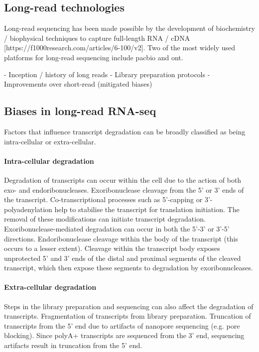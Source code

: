 \subsection{Long-read technologies}

Long-read sequencing has been made possible by the development of biochemistry / biophysical techniques to capture full-length RNA / cDNA [https://f1000research.com/articles/6-100/v2]. Two of the most widely used platforms for long-read sequencing include \gls{pacbio} and \gls{ont}.    

- Inception / history of long reads
- Library preparation protocols
- Improvements over short-read (mitigated biases)

\subsection{Biases in long-read RNA-seq}


Factors that influence transcript degradation can be broadly classified as being intra-cellular or extra-cellular. 

\paragraph{Intra-cellular degradation} Degradation of transcripts can occur within the cell due to the action of both exo- and endoribonucleases. Exoribonuclease cleavage from the 5’ or 3’ ends of the transcript. Co-transcriptional processes such as 5’-capping or 3’-polyadenylation help to stabilise the transcript for translation initiation. The removal of these modifications can initiate transcript degradation. Exoribonuclease-mediated degradation can occur in both the 5’-3’ or 3’-5’ directions. Endoribonuclease cleavage within the body of the transcript (this occurs to a lesser extent). Cleavage within the transcript body exposes unprotected 5’ and 3’ ends of the distal and proximal segments of the cleaved transcript, which then expose these segments to degradation by exoribonucleases. 

\paragraph{Extra-cellular degradation} Steps in the library preparation and sequencing can also affect the degradation of transcripts. Fragmentation of transcripts from library preparation. Truncation of transcripts from the 5’ end due to artifacts of nanopore sequencing (e.g. pore blocking). Since polyA+ transcripts are sequenced from the 3’ end, sequencing artifacts result in truncation from the 5’ end.

